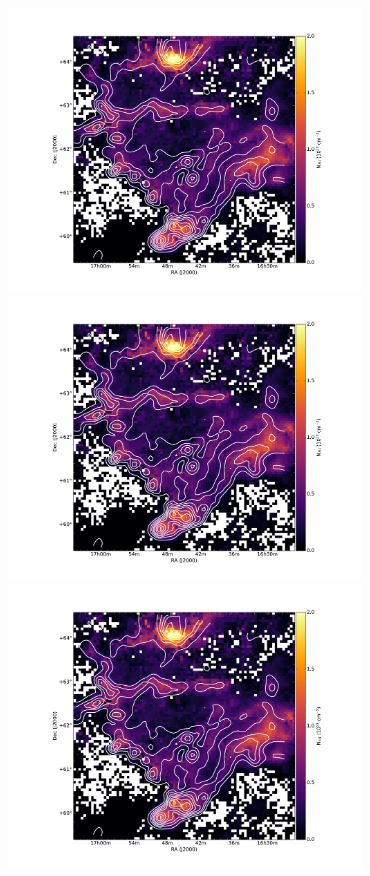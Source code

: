 \documentclass[traditabstract]{aa}
\begin{document}




\begin{figure}[h]
  \centering
  \includegraphics[page=1,height=7.5cm,trim=45 5 65 35,clip=true]{Figures/GHIGLS_NHI.pdf}
  \hspace{3mm}
  \includegraphics[page=4,height=7.5cm,trim=45 5 65 35,clip=true]{Figures/GHIGLS_NHI.pdf} \\
  \vspace{3mm}
  \includegraphics[page=2,height=7.5cm,trim=45 5 65 35,clip=true]{Figures/GHIGLS_NHI.pdf}

\end{figure}
\end{document}
